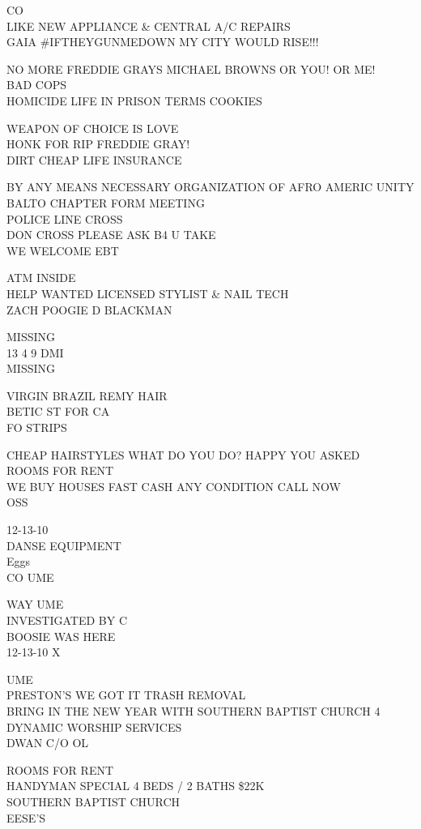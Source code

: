 \documentclass[10pt,letterpaper]{article}
\begin{document}
CO\\
LIKE NEW APPLIANCE \& CENTRAL A/C REPAIRS\\
GAIA \#IFTHEYGUNMEDOWN MY CITY WOULD RISE!!!

NO MORE FREDDIE GRAYS MICHAEL BROWNS OR YOU!  OR ME!\\
BAD COPS\\
HOMICIDE LIFE IN PRISON TERMS COOKIES

WEAPON OF CHOICE IS LOVE\\
HONK FOR RIP FREDDIE GRAY!\\
DIRT CHEAP LIFE INSURANCE

BY ANY MEANS NECESSARY ORGANIZATION OF AFRO AMERIC UNITY BALTO CHAPTER FORM MEETING\\
POLICE LINE CROSS\\
DON CROSS PLEASE ASK B4 U TAKE\\
WE WELCOME EBT

ATM INSIDE\\
HELP WANTED LICENSED STYLIST \& NAIL TECH\\
ZACH POOGIE D BLACKMAN

MISSING\\
13 4 9 DMI\\
MISSING

VIRGIN BRAZIL REMY HAIR\\
BETIC ST FOR CA\\
FO STRIPS

CHEAP HAIRSTYLES WHAT DO YOU DO? HAPPY YOU ASKED\\
ROOMS FOR RENT\\
WE BUY HOUSES FAST CASH ANY CONDITION CALL NOW\\
OSS

12{-}13{-}10\\
DANSE EQUIPMENT\\
Eggs\\
CO UME

WAY UME\\
INVESTIGATED BY C\\
BOOSIE WAS HERE\\
12{-}13{-}10 X

UME\\
PRESTON'S WE GOT IT TRASH REMOVAL\\
BRING IN THE NEW YEAR WITH SOUTHERN BAPTIST CHURCH 4 DYNAMIC WORSHIP SERVICES\\
DWAN C/O OL

ROOMS FOR RENT\\
HANDYMAN SPECIAL 4 BEDS / 2 BATHS \$22K\\
SOUTHERN BAPTIST CHURCH\\
EESE'S
\end{document}
